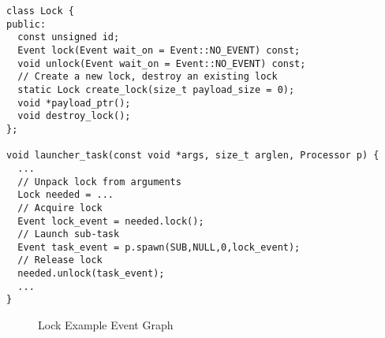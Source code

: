 

\begin{lstlisting}[float={t},label={lst:lockapi},caption={Deferred Lock Interface and Example.}]
class Lock {
public:
  const unsigned id;
  Event lock(Event wait_on = Event::NO_EVENT) const;
  void unlock(Event wait_on = Event::NO_EVENT) const;
  // Create a new lock, destroy an existing lock
  static Lock create_lock(size_t payload_size = 0);
  void *payload_ptr();
  void destroy_lock();
};

void launcher_task(const void *args, size_t arglen, Processor p) {
  ...
  // Unpack lock from arguments
  Lock needed = ...
  // Acquire lock
  Event lock_event = needed.lock();
  // Launch sub-task
  Event task_event = p.spawn(SUB,NULL,0,lock_event);
  // Release lock
  needed.unlock(task_event);
  ...
}
\end{lstlisting}

\begin{figure}
\centering
{}
\caption{Lock Example Event Graph\label{fig:lockevents}}
\end{figure}

